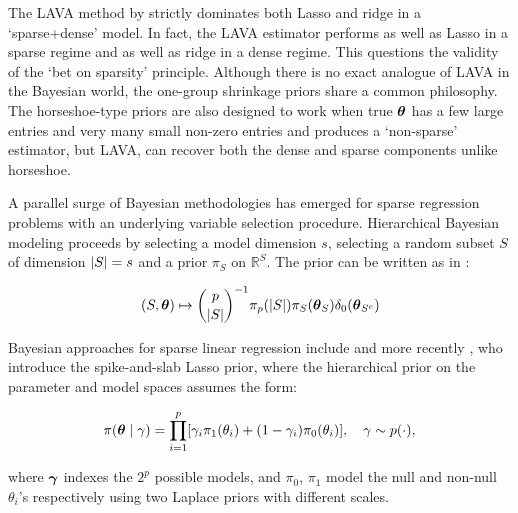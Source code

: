 \documentclass[sts,preprint]{imsart}
\begin{document}
\begin{remark}

The LAVA method by \citet{chernozhukov2017lava} strictly dominates both Lasso and ridge in a `sparse+dense' model. In fact, the LAVA estimator performs as well as Lasso in a sparse regime and as well as ridge \citep{tikhonov1963solution} in a dense regime. This questions the validity of the `bet on sparsity' principle. 
Although there is no exact analogue of LAVA in the Bayesian world, the one-group shrinkage priors share a common philosophy. The horseshoe-type priors are also designed to work when true $\boldsymbol{\theta}$ has a few large entries and very many small non-zero entries and produces a `non-sparse' estimator, but LAVA, can recover both the dense and sparse components unlike horseshoe.

\end{remark}

A parallel surge of Bayesian methodologies has emerged for sparse regression problems with an underlying variable selection procedure. Hierarchical Bayesian modeling proceeds by selecting a model dimension $s$, selecting a random subset $S$ of dimension $\lvert S\rvert = s$ and a prior $\pi_S$ on $\mathbb{R}^{S}$. The prior can be written as in \cite{castillo2015bayesian}:

\begin{equation}
  (S,\boldsymbol{\theta}) \mapsto \binom{p}{\lvert S\rvert}^{-1} 
	\pi_p(\lvert S\rvert) \pi_S(\boldsymbol{\theta}_S)\delta_{0}(\boldsymbol{\theta}_{S^c}) \label{eq:bayes-hier}
\end{equation}

\noindent Bayesian approaches for sparse linear regression include \citet{george2000variable, George0000, mitchell88, ishwaran2005spike} and more recently \cite{rovckova2016spike}, who introduce the spike-and-slab Lasso prior, where the hierarchical prior on the parameter and model spaces assumes the form:

\begin{equation}
  \pi(\boldsymbol{\theta} \mid \gamma) = \prod_{i=1}^{p} [\gamma_i \pi_1(\theta_i) +
  (1-\gamma_i) \pi_0(\theta_i)], \quad \gamma \sim p(\cdot), \label{eq:ssl}
\end{equation}

where $\boldsymbol{\gamma}$ indexes the $2^p$ possible models, and $\pi_0$, $\pi_1$ model the null and non-null $\theta_i$'s respectively using two Laplace priors with different scales. 

\end{document}
